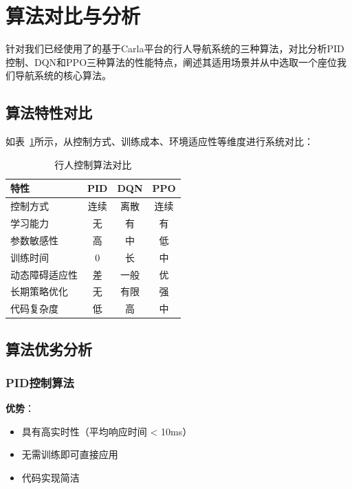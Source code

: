 \section{算法对比与分析}

针对我们已经使用了的基于Carla平台的行人导航系统的三种算法，对比分析PID控制、DQN和PPO三种算法的性能特点，阐述其适用场景并从中选取一个座位我们导航系统的核心算法。

\subsection{算法特性对比}

如表~\ref{tab:algorithm_comparison}所示，从控制方式、训练成本、环境适应性等维度进行系统对比：

\begin{table}[H]
  \centering
  \caption{行人控制算法对比}
  \label{tab:algorithm_comparison}
  \begin{tabular}{lccc}
    \toprule
    \textbf{特性} & \textbf{PID} & \textbf{DQN} & \textbf{PPO} \\
    \midrule
    控制方式 & 连续 & 离散 & 连续 \\
    学习能力 & 无 & 有 & 有 \\
    参数敏感性 & 高 & 中 & 低 \\
    训练时间 & 0 & 长 & 中 \\
    动态障碍适应性 & 差 & 一般 & 优 \\
    长期策略优化 & 无 & 有限 & 强 \\
    代码复杂度 & 低 & 高 & 中 \\
    \bottomrule
  \end{tabular}
\end{table}

\subsection{算法优劣分析}

\subsubsection{PID控制算法}

\textbf{优势}：
\begin{itemize}
  \item 具有高实时性（平均响应时间 < 10ms）
  \item 无需训练即可直接应用
  \item 代码实现简洁
\end{itemize}

